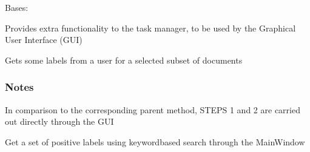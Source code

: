 \documentclass[letterpaper,10pt,english]{sphinxmanual}
\begin{document}
\begin{fulllineitems}
\label{\detokenize{dc_task_manager:src.task_manager.TaskManagerGUI}}
\sphinxAtStartPar
Bases: {\hyperref[\detokenize{dc_task_manager:src.task_manager.TaskManager}]{}}

\sphinxAtStartPar
Provides extra functionality to the task manager, to be used by the
Graphical User Interface (GUI)

\begin{fulllineitems}
\label{\detokenize{dc_task_manager:src.task_manager.TaskManagerGUI.get_feedback}}
\sphinxAtStartPar
Gets some labels from a user for a selected subset of documents
\subsubsection*{Notes}

\sphinxAtStartPar
In comparison to the corresponding parent method, STEPS 1 and 2 are
carried out directly through the GUI

\end{fulllineitems}


\begin{fulllineitems}
\label{\detokenize{dc_task_manager:src.task_manager.TaskManagerGUI.get_labels_by_keywords}}
\sphinxAtStartPar
Get a set of positive labels using keyword\sphinxhyphen{}based search through the
MainWindow


\end{fulllineitems}
\end{fulllineitems}
\end{document}
